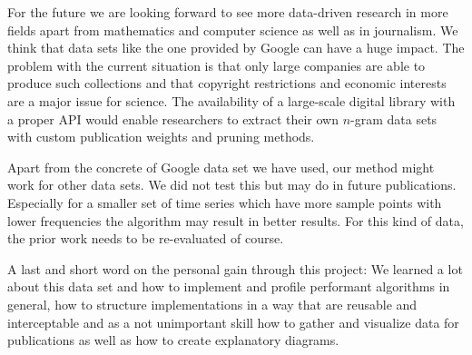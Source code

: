 For the future we are looking forward to see more data-driven research in more fields apart from mathematics and computer science as well as in journalism. We think that data sets like the one provided by Google can have a huge impact. The problem with the current situation is that only large companies are able to produce such collections and that copyright restrictions and economic interests are a major issue for science. The availability of a large-scale digital library with a proper API would enable researchers to extract their own $n$-gram data sets with custom publication weights and pruning methods.

Apart from the concrete of Google data set we have used, our method might work for other data sets. We did not test this but may do in future publications. Especially for a smaller set of time series which have more sample points with lower frequencies the algorithm may result in better results. For this kind of data, the prior work needs to be re-evaluated of course.

A last and short word on the personal gain through this project: We learned a lot about this data set and how to implement and profile performant algorithms in general, how to structure implementations in a way that are reusable and interceptable and as a not unimportant skill how to gather and visualize data for publications as well as how to create explanatory diagrams.
